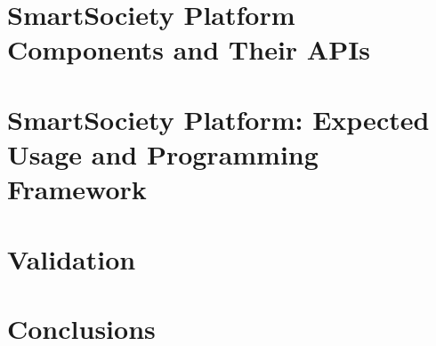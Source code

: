 \documentclass{SmartReport}
\begin{document}
\section{SmartSociety Platform Components and Their APIs}
\label{sec:sw}

\newpage


\section{SmartSociety Platform: Expected Usage and Programming Framework}
\label{sec:usage}


\section{Validation}
\label{sec:val}

\newpage


\section{Conclusions}
\label{sec:concl}

\newpage



% 
\end{document}
